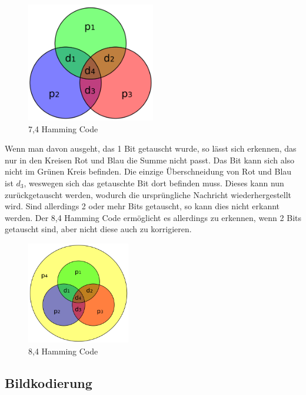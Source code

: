 \vspace*{-1cm}

\begin{figure}[H]
    \centering
    \includegraphics[width=0.5\textwidth]{images/hamming7.4.png}
    \caption{7,4 Hamming Code}
\end{figure}

Wenn man davon ausgeht, das 1 Bit getauscht wurde, so lässt sich erkennen,
das nur in den Kreisen Rot und Blau die Summe nicht passt. Das Bit kann
sich also nicht im Grünen Kreis befinden. Die einzige Überschneidung
von Rot und Blau ist $d_3$, weswegen sich das getauschte Bit dort befinden
muss. Dieses kann nun zurückgetauscht werden, wodurch die ursprüngliche Nachricht
wiederhergestellt wird. Sind allerdings 2 oder mehr Bits getauscht, so kann dies
nicht erkannt werden. Der 8,4 Hamming Code ermöglicht es allerdings zu erkennen, wenn
2 Bits getauscht sind, aber nicht diese auch zu korrigieren.

\begin{figure}[H]
    \centering
    \includegraphics[width=0.4\textwidth]{images/hamming8.4.png}
    \caption{8,4 Hamming Code}
\end{figure}

\subsection{Bildkodierung}

